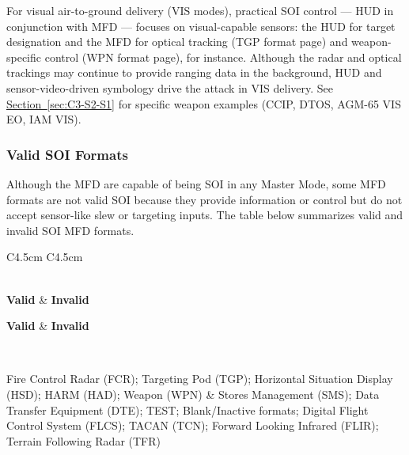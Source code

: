 \documentclass[11pt, a4paper, twoside]{report}
\newcommand{\secref}[1]{\hyperref[#1]{Section~\ref*{#1}}}
\begin{document}
For visual air-to-ground delivery (VIS modes), practical SOI control --- HUD in conjunction with MFD --- focuses on visual-capable sensors: the HUD for target designation and the MFD for optical tracking (TGP format page) and weapon-specific control (WPN format page), for instance. Although the radar and optical trackings may continue to provide ranging data in the background, HUD and sensor-video-driven symbology drive the attack in VIS delivery. See \secref{sec:C3-S2-S1} for specific weapon examples (CCIP, DTOS, AGM-65 VIS EO, IAM VIS).

\subsubsection{Valid SOI Formats}
\label{sec:C3-S1-S1-S1}

Although the MFD are capable of being SOI in any Master Mode, some MFD formats are not valid SOI because they provide information or control but do not accept sensor-like slew or targeting inputs. The table below summarizes valid and invalid SOI MFD formats.

\begin{longtable}{C{4.5cm} C{4.5cm}}
	\caption{Valid and Invalid SOI MFD Formats \label{tab:C3-S1-MFD-format}}\\
	
	\textbf{\color{white}Valid} & \textbf{\color{white}Invalid}\\
	\endfirsthead
	
	\textbf{\color{white}Valid} & \textbf{\color{white}Invalid}\\
	\endhead
	
	\\
	\endfoot
	
	\endlastfoot
	
	Fire Control Radar (FCR); Targeting Pod (TGP); Horizontal Situation Display (HSD); HARM (HAD); Weapon (WPN) & Stores Management (SMS); Data Transfer Equipment (DTE); TEST; Blank/Inactive formats; Digital Flight Control System (FLCS); TACAN (TCN); Forward Looking Infrared (FLIR); Terrain Following Radar (TFR)
\end{longtable}

\end{document}
